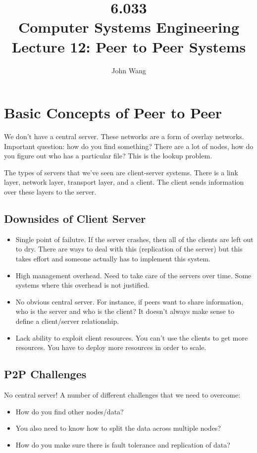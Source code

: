 \documentclass[psamsfonts]{amsart}
\title{6.033 \\
Computer Systems Engineering \\
Lecture 12: Peer to Peer Systems}
\author{John Wang}
\begin{document}
\maketitle

\section{Basic Concepts of Peer to Peer}

We don't have a central server. These networks are a form of overlay networks. Important question: how do you find something? There are a lot of nodes, how do you figure out who has a particular file? This is the lookup problem.

The types of servers that we've seen are client-server systems. There is a link layer, network layer, transport layer, and a client. The client sends information over these layers to the server.

\subsection{Downsides of Client Server}

\begin{itemize}
  \item Single point of failutre. If the server crashes, then all of the clients are left out to dry. There are ways to deal with this (replication of the server) but this takes effort and someone actually has to implement this system.
  \item High management overhead. Need to take care of the servers over time. Some systems where this overhead is not justified.
  \item No obvious central server. For instance, if peers want to share information, who is the server and who is the client? It doesn't always make sense to define a client/server relationship.
  \item Lack ability to exploit client resources. You can't use the clients to get more resources. You have to deploy more resources in order to scale.
\end{itemize}

\subsection{P2P Challenges}

No central server! A number of different challenges that we need to overcome:

\begin{itemize}
  \item How do you find other nodes/data?
  \item You also need to know how to split the data across multiple nodes?
  \item How do you make sure there is fault tolerance and replication of data?
\end{itemize}
\end{document}
